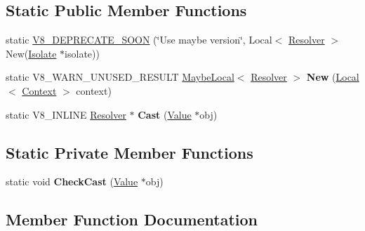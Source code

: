\subsection*{Static Public Member Functions}
\begin{DoxyCompactItemize}
\item 
static \hyperlink{classv8_1_1_promise_1_1_resolver_a1aa04adcad6243802a3f9819fa840312}{V8\+\_\+\+D\+E\+P\+R\+E\+C\+A\+T\+E\+\_\+\+S\+O\+ON} (\char`\"{}Use maybe version\char`\"{}, Local$<$ \hyperlink{classv8_1_1_promise_1_1_resolver}{Resolver} $>$ New(\hyperlink{classv8_1_1_isolate}{Isolate} $\ast$isolate))
\item 
static V8\+\_\+\+W\+A\+R\+N\+\_\+\+U\+N\+U\+S\+E\+D\+\_\+\+R\+E\+S\+U\+LT \hyperlink{classv8_1_1_maybe_local}{Maybe\+Local}$<$ \hyperlink{classv8_1_1_promise_1_1_resolver}{Resolver} $>$ {\bfseries New} (\hyperlink{classv8_1_1_local}{Local}$<$ \hyperlink{classv8_1_1_context}{Context} $>$ context)\hypertarget{classv8_1_1_promise_1_1_resolver_a39a1f3acb070c85830aca527eebc3259}{}\label{classv8_1_1_promise_1_1_resolver_a39a1f3acb070c85830aca527eebc3259}

\item 
static V8\+\_\+\+I\+N\+L\+I\+NE \hyperlink{classv8_1_1_promise_1_1_resolver}{Resolver} $\ast$ {\bfseries Cast} (\hyperlink{classv8_1_1_value}{Value} $\ast$obj)\hypertarget{classv8_1_1_promise_1_1_resolver_ab2b541cb210158ed0c757c8b7dc46279}{}\label{classv8_1_1_promise_1_1_resolver_ab2b541cb210158ed0c757c8b7dc46279}

\end{DoxyCompactItemize}
\subsection*{Static Private Member Functions}
\begin{DoxyCompactItemize}
\item 
static void {\bfseries Check\+Cast} (\hyperlink{classv8_1_1_value}{Value} $\ast$obj)\hypertarget{classv8_1_1_promise_1_1_resolver_aa42133082f3d2952a6c9e3fe01668639}{}\label{classv8_1_1_promise_1_1_resolver_aa42133082f3d2952a6c9e3fe01668639}

\end{DoxyCompactItemize}


\subsection{Member Function Documentation}
